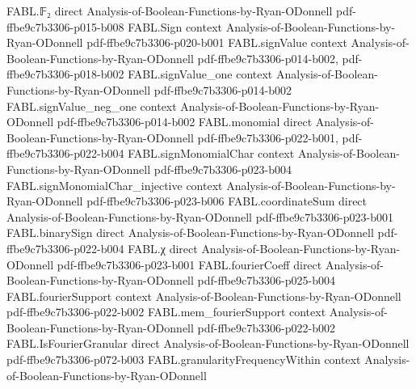 \begin{theorem}
\leanok
{}
\proofstep
  {FABL.𝔽₂}
  {direct}
  {Analysis-of-Boolean-Functions-by-Ryan-ODonnell}
  {pdf-ffbe9c7b3306-p015-b008}
\proofstep
  {FABL.Sign}
  {context}
  {Analysis-of-Boolean-Functions-by-Ryan-ODonnell}
  {pdf-ffbe9c7b3306-p020-b001}
\proofstep
  {FABL.signValue}
  {context}
  {Analysis-of-Boolean-Functions-by-Ryan-ODonnell}
  {pdf-ffbe9c7b3306-p014-b002,
    pdf-ffbe9c7b3306-p018-b002}
\proofstep
  {FABL.signValue_one}
  {context}
  {Analysis-of-Boolean-Functions-by-Ryan-ODonnell}
  {pdf-ffbe9c7b3306-p014-b002}
\proofstep
  {FABL.signValue_neg_one}
  {context}
  {Analysis-of-Boolean-Functions-by-Ryan-ODonnell}
  {pdf-ffbe9c7b3306-p014-b002}
\proofstep
  {FABL.monomial}
  {direct}
  {Analysis-of-Boolean-Functions-by-Ryan-ODonnell}
  {pdf-ffbe9c7b3306-p022-b001,
    pdf-ffbe9c7b3306-p022-b004}
\proofstep
  {FABL.signMonomialChar}
  {context}
  {Analysis-of-Boolean-Functions-by-Ryan-ODonnell}
  {pdf-ffbe9c7b3306-p023-b004}
\proofstep
  {FABL.signMonomialChar_injective}
  {context}
  {Analysis-of-Boolean-Functions-by-Ryan-ODonnell}
  {pdf-ffbe9c7b3306-p023-b006}
\proofstep
  {FABL.coordinateSum}
  {direct}
  {Analysis-of-Boolean-Functions-by-Ryan-ODonnell}
  {pdf-ffbe9c7b3306-p023-b001}
\proofstep
  {FABL.binarySign}
  {direct}
  {Analysis-of-Boolean-Functions-by-Ryan-ODonnell}
  {pdf-ffbe9c7b3306-p022-b004}
\proofstep
  {FABL.χ}
  {direct}
  {Analysis-of-Boolean-Functions-by-Ryan-ODonnell}
  {pdf-ffbe9c7b3306-p023-b001}
\proofstep
  {FABL.fourierCoeff}
  {direct}
  {Analysis-of-Boolean-Functions-by-Ryan-ODonnell}
  {pdf-ffbe9c7b3306-p025-b004}
\proofstep
  {FABL.fourierSupport}
  {context}
  {Analysis-of-Boolean-Functions-by-Ryan-ODonnell}
  {pdf-ffbe9c7b3306-p022-b002}
\proofstep
  {FABL.mem_fourierSupport}
  {context}
  {Analysis-of-Boolean-Functions-by-Ryan-ODonnell}
  {pdf-ffbe9c7b3306-p022-b002}
\proofstep
  {FABL.IsFourierGranular}
  {direct}
  {Analysis-of-Boolean-Functions-by-Ryan-ODonnell}
  {pdf-ffbe9c7b3306-p072-b003}
\proofstep
  {FABL.granularityFrequencyWithin}
  {context}
  {Analysis-of-Boolean-Functions-by-Ryan-ODonnell}

\end{theorem}
